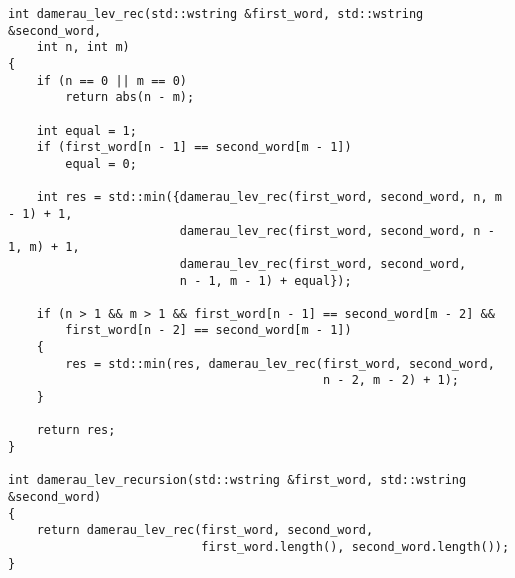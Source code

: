 \clearpage

\begin{lstlisting}[label=lst:dameray_lev_mtr,caption=Функция нахождения расстояния Дамерау-Левенштейна рекурсивно]
int damerau_lev_rec(std::wstring &first_word, std::wstring &second_word,
	int n, int m)
{
	if (n == 0 || m == 0)
		return abs(n - m);

	int equal = 1;
	if (first_word[n - 1] == second_word[m - 1])
		equal = 0;

	int res = std::min({damerau_lev_rec(first_word, second_word, n, m - 1) + 1,
						damerau_lev_rec(first_word, second_word, n - 1, m) + 1,
						damerau_lev_rec(first_word, second_word,
						n - 1, m - 1) + equal});

	if (n > 1 && m > 1 && first_word[n - 1] == second_word[m - 2] &&
		first_word[n - 2] == second_word[m - 1])
	{
		res = std::min(res, damerau_lev_rec(first_word, second_word,
											n - 2, m - 2) + 1);
	}

	return res;
}

int damerau_lev_recursion(std::wstring &first_word, std::wstring &second_word)
{
    return damerau_lev_rec(first_word, second_word,
                           first_word.length(), second_word.length());
}
\end{lstlisting}

\clearpage

